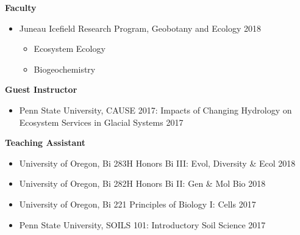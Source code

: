 \documentclass[10pt]{article}
\newenvironment{innerlist}[1][\enskip\textbullet]%
        {\begin{itemize}[#1,leftmargin=*,parsep=0pt,itemsep=0pt,topsep=0pt,partopsep=0pt]}
        {\end{itemize}}
\begin{document}
\textbf{Faculty} %
\begin{innerlist}
\item[] Juneau Icefield Research Program, Geobotany and Ecology
	\hfill 2018
\begin{innerlist}
\item Ecosystem Ecology
\item Biogeochemistry
\end{innerlist}
\end{innerlist}

\textbf{Guest Instructor} %
\begin{innerlist}
\item[] Penn State University, CAUSE 2017: Impacts of Changing Hydrology on Ecosystem Services in Glacial Systems \hfill 2017
\end{innerlist}

\textbf{Teaching Assistant} %
\begin{innerlist}
\item[] University of Oregon, Bi 283H Honors Bi III: Evol, Diversity \& Ecol
	\hfill 2018
\item[] University of Oregon, Bi 282H Honors Bi II: Gen \& Mol Bio \hfill 2018
\item[] University of Oregon, Bi 221 Principles of Biology I: Cells \hfill 2017
\item[] Penn State University, SOILS 101: Introductory Soil Science \hfill
	2017
\end{innerlist}
\end{document}

